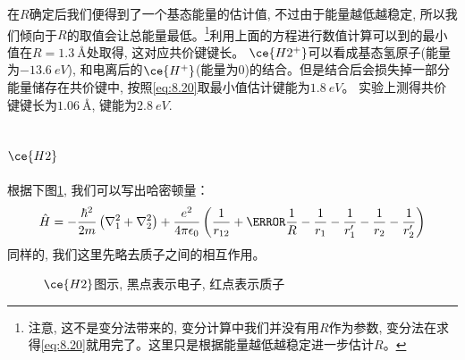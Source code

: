 \documentclass[a4paper,zihao=-4,linespread=1]{ctexrep}
\begin{document}
    在$R$确定后我们便得到了一个基态能量的估计值, 不过由于能量越低越稳定, 所以我们倾向于$R$的取值会让总能量最低。\footnote{注意, 这不是变分法带来的, 变分计算中我们并没有用$R$作为参数, 
    变分法在求得\ref{eq:8.20}就用完了。这里只是根据能量越低越稳定进一步估计$R$。}利用上面的方程进行数值计算可以到的最小值在$R=\SI[]{1.3}{\angstrom}$处取得, 这对应共价键键长。
    $\ce{H2^+}$可以看成基态氢原子(能量为$\SI[]{-13.6}{eV}$), 和电离后的$\ce{H^+}$(能量为0)的结合。但是结合后会损失掉一部分能量储存在共价键中, 按照\ref{eq:8.20}取最小值估计键能为$\SI[]{1.8}{eV}$。
    实验上测得共价键键长为$\SI[]{1.06}{\angstrom}$, 键能为$\SI[]{2.8}{eV}$.
    
    \subsection*{$\ce{H2}$}
    根据下图\ref{fig:8.1}, 我们可以写出哈密顿量：
    \begin{equation}
        \hat{H}=-\frac{\hbar^{2}}{2 m}\left(\nabla_{1}^{2}+\nabla_{2}^{2}\right)+\frac{e^{2}}{4 \pi \epsilon_{0}}\left(\frac{1}{r_{12}}+\cancel{\frac{1}{R}}-\frac{1}{r_{1}}-\frac{1}{r_{1}^{\prime}}-\frac{1}{r_{2}}-\frac{1}{r_{2}^{\prime}}\right)
    \end{equation}
    同样的, 我们这里先略去质子之间的相互作用。
    \begin{figure}[htbp]
        \centering
        \caption{$\ce{H2}$图示, 黑点表示电子, {\color{red} 红点}表示质子}
        \label{fig:8.1}
    \end{figure}
    
\end{document}
